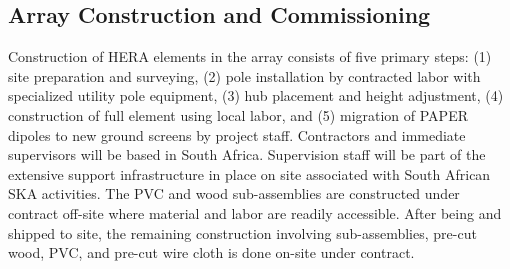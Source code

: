 \documentclass[preprint]{aastex}
\begin{document}
\vspace{-0.25in}
\subsection{Array Construction and Commissioning}
\vspace{-6pt}

Construction of HERA elements in the array consists of five primary steps: 
(1) site preparation and surveying, (2) pole installation by contracted labor with specialized utility pole equipment,
(3) hub placement and height adjustment, (4) construction of full element using local labor,
and (5) migration of PAPER dipoles to new ground screens by project staff.
Contractors and immediate supervisors will be based in South Africa.  Supervision staff 
will be part of the extensive support infrastructure in place on site associated with South African SKA activities.
The PVC and wood sub-assemblies 
are constructed under contract off-site where material and labor are readily accessible.  After being and shipped to site, the
remaining construction involving sub-assemblies, pre-cut wood, PVC, and pre-cut wire cloth 
is done on-site under contract.  


\end{document}
